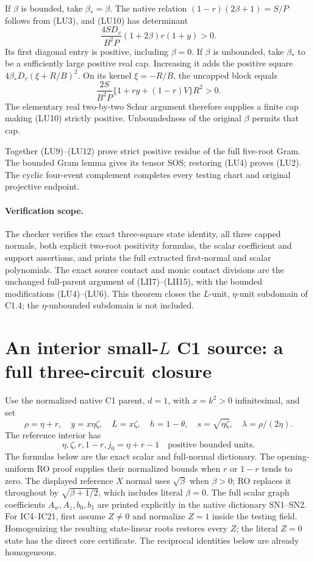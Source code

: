 If $\beta$ is bounded, take $\beta_*=\beta$.  The native relation
$(1-r)(2\beta+1)=S/P$ follows from (LU3), and (LU10) has determinant
\[
 \frac{4S D_v}{B^2P}(1+2\beta)r(1+y)>0.                 \tag{LU11}
\]
Its first diagonal entry is positive, including $\beta=0$.
If $\beta$ is unbounded, take $\beta_*$ to be a sufficiently large
positive real cap.  Increasing it adds the positive square
$4\beta_*D_v(\xi+R/B)^2$.  On its kernel $\xi=-R/B$,
the uncapped block equals
\[
          \frac{2S}{B^2P}\{1+ry+(1-r)V\}R^2>0.           \tag{LU12}
\]
The elementary real two-by-two Schur argument therefore supplies
a finite cap making (LU10) strictly positive.  Unboundedness of the
original $\beta$ permits that cap.

Together (LU9)--(LU12) prove strict positive residue of the full
five-root Gram.  The bounded Gram lemma gives its tensor SOS;
restoring (LU4) proves (LU2).  The cyclic four-event complement
completes every testing chart and original projective endpoint.

\paragraph{Verification scope.}
The checker verifies the exact three-square state identity, all three
capped normals, both explicit two-root positivity formulas, the scalar
coefficient and support assertions, and prints the full extracted
first-normal and scalar polynomials.  The exact source contact and
monic contact divisions are the unchanged full-parent argument of
(LII7)--(LII15), with the bounded modifications (LU4)--(LU6).
This theorem closes the $L$-unit, $\eta$-unit subdomain of C1.4;
the $\eta$-unbounded subdomain is not included.


\section{\texorpdfstring{An interior small-$L$ C1 source: a full three-circuit closure}{An interior small-L C1 source: a full three-circuit closure}}
\label{component:pe3ef590c01d6}

\label{pe3ef590c01d6:sec:r9-c1-small-interior}

Use the normalized native C1 parent, $d=1$, with $x=k^2>0$
infinitesimal, and set
\[
 \rho=\eta+r,\quad y=x\eta\zeta,\quad L=x\zeta,\quad
 h=1-\theta,\quad s=\sqrt{\eta\zeta},\quad
 \lambda=\rho/(2\eta).
\]
The reference interior has
\[
 \eta,\zeta,r,1-r,j_0=\eta+r-1
       \quad\text{positive bounded units}.                    \tag{IC1}
\]
The formulas below are the exact scalar and full-normal dictionary.
The opening-uniform RO proof supplies their normalized bounds when
$r$ or $1-r$ tends to zero.  The displayed reference $X$ normal
uses $\sqrt\beta$ when $\beta>0$; RO replaces it throughout by
$\sqrt{\beta+1/2}$, which includes literal $\beta=0$.
The full scalar graph coefficients $A_w,A_z,b_0,b_1$ are printed
explicitly in the native dictionary SN1--SN2.
For IC4--IC21, first assume $Z\ne0$ and normalize $Z=1$ inside
the testing field.  Homogenizing the resulting state-linear roots
restores every $Z$; the literal $Z=0$ state has the direct core
certificate.  The reciprocal identities below are already homogeneous.
